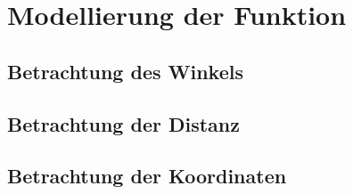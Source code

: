 \section{Modellierung der Funktion}
\subsection{Betrachtung des Winkels}
\subsection{Betrachtung der Distanz}
\subsection{Betrachtung der Koordinaten}